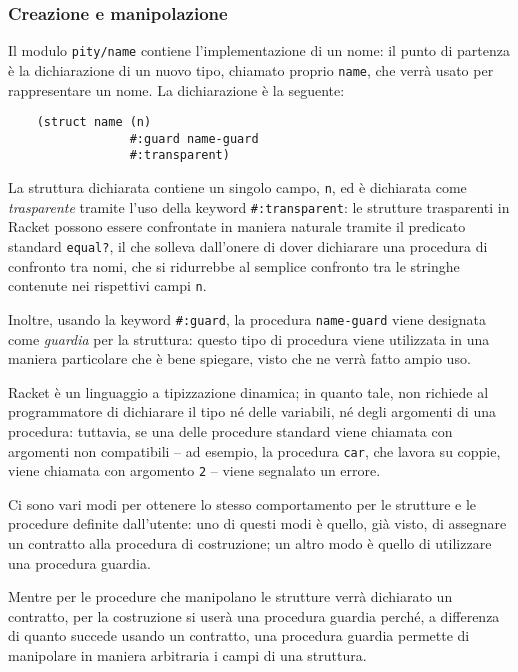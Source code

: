 \subsubsection{Creazione e manipolazione}

Il modulo \lstinline{pity/name} contiene l'implementazione di un nome: il
punto di partenza \`e la dichiarazione di un nuovo tipo, chiamato proprio
\lstinline{name}, che verr\`a usato per rappresentare un nome. La
dichiarazione \`e la seguente:

\begin{lstlisting}
    (struct name (n)
                 #:guard name-guard
                 #:transparent)
\end{lstlisting}

La struttura dichiarata contiene un singolo campo, \lstinline{n}, ed \`e
dichiarata come \emph{trasparente} tramite l'uso della keyword
\lstinline{#:transparent}: le strutture trasparenti in Racket possono essere
confrontate in maniera naturale tramite il predicato standard
\lstinline{equal?}, il che solleva dall'onere di dover dichiarare una
procedura di confronto tra nomi, che si ridurrebbe al semplice confronto
tra le stringhe contenute nei rispettivi campi \lstinline{n}.

Inoltre, usando la keyword \lstinline{#:guard}, la procedura
\lstinline{name-guard} viene designata come \emph{guardia} per la struttura:
questo tipo di procedura viene utilizzata in una maniera particolare che \`e
bene spiegare, visto che ne verr\`a fatto ampio uso.

Racket \`e un linguaggio a tipizzazione dinamica; in quanto tale, non
richiede al programmatore di dichiarare il tipo n\'e delle variabili, n\'e
degli argomenti di una procedura: tuttavia, se una delle procedure standard
viene chiamata con argomenti non compatibili -- ad esempio, la procedura
\lstinline{car}, che lavora su coppie, viene chiamata con argomento
\lstinline{2} --  viene segnalato un errore.

Ci sono vari modi per ottenere lo stesso comportamento per le strutture e
le procedure definite dall'utente: uno di questi modi \`e quello, gi\`a
visto, di assegnare un contratto alla procedura di costruzione; un altro
modo \`e quello di utilizzare una procedura guardia.

Mentre per le procedure che manipolano le strutture verr\`a dichiarato
un contratto, per la costruzione si user\`a una procedura guardia
perch\'e, a differenza di quanto succede usando un contratto, una
procedura guardia permette di manipolare in maniera arbitraria i campi
di una struttura.

